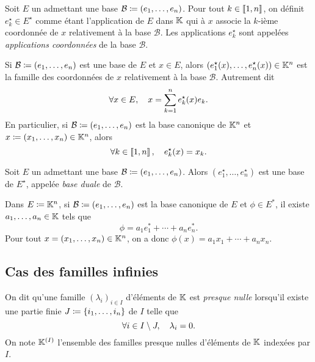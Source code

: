 \documentclass{magnolia}
\begin{document}
\begin{definition}
Soit $E$ un \Kev admettant une base $\mathcal{B}\coloneqq(e_1,\ldots,e_n)$. Pour tout $k\in\left\llbracket 1,n\right\rrbracket$,
on définit $e_k^\star\in E^\star$ comme étant l'application de $E$ dans $\mathbb{K}$ qui à $x$ associe la
$k$-ième coordonnée de $x$ relativement à la base $\mathcal{B}$. Les applications $e_k^\star$ sont
appelées \emph{applications coordonnées} de la base $\mathcal{B}$.
\end{definition}

\begin{remarques}
\remarque Si $\mathcal{B}\coloneqq(e_1,\ldots,e_n)$ est une base de $E$ et $x\in E$,
  alors $(e_1^\star(x),\ldots,e_n^\star(x))\in\mathbb{K}^n$ est la famille des coordonnées de $x$
  relativement à la base $\mathcal{B}$. Autrement dit
  \[\forall x\in E,\quad x=\sum_{k=1}^n e_k^{\star}(x)e_k.\]
\remarque En particulier, si $\mathcal{B}\coloneqq(e_1,\ldots,e_n)$ est la base canonique
  de $\mathbb{K}^n$ et $x\coloneqq(x_1,\ldots,x_n)\in\mathbb{K}^n$, alors
  \[\forall k\in\left\llbracket 1,n\right\rrbracket,\quad e_k^\star(x)=x_k.\]
\end{remarques}

\begin{definition}
Soit $E$ un \Kev admettant une base $\mathcal{B}\coloneqq(e_1,\ldots,e_n)$. Alors $(e_1^\star,\ldots,e_n^\star)$
est une base de $E^\star$, appelée \emph{base duale} de $\mathcal{B}$.
\end{definition}

\begin{remarqueUnique}
\remarque Dans $E\coloneqq \mathbb{K}^n$, si $\mathcal{B}\coloneqq(e_1,\ldots,e_n)$ est la base canonique
  de $E$ et $\phi\in E^*$, il existe $a_1,\ldots,a_n\in\mathbb{K}$ tels que
  \[\phi=a_1 e_1^*+\cdots+a_n e_n^*.\]
  Pour tout $x=(x_1,\ldots,x_n)\in\mathbb{K}^n$, on a donc $\phi(x)=a_1 x_1+\cdots+a_n x_n$.
\end{remarqueUnique}

\subsection{Cas des familles infinies}

\begin{definition}
  On dit qu'une famille $(\lambda_i)_{i\in I}$ d'éléments de $\mathbb{K}$ est \emph{presque nulle} lorsqu'il existe une partie finie
  $J\coloneqq\left\{i_1,\ldots,i_n\right\}$ de $I$ telle que
  \[\forall i\in I\setminus J,\quad \lambda_i=0.\]
  On note $\mathbb{K}^{(I)}$ l'ensemble des familles presque nulles d'éléments de $\mathbb{K}$ indexées par $I$.
\end{definition}
\end{document}
